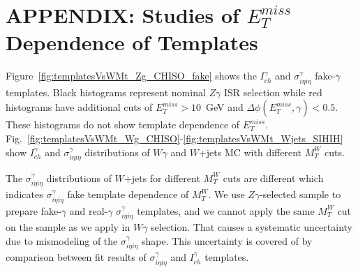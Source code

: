 \chapter{APPENDIX: Studies of $E_T^{miss}$ Dependence of Templates}
\label{sec:CompareTemplatesPlots}

Figure~\ref{fig:templatesVsWMt_Zg_CHISO_fake} shows the $I_{ch}^{\gamma}$ and $\sigma_{i\eta i\eta}^{\gamma}$ fake-$\gamma$ templates. Black histograms represent nominal $Z\gamma$ ISR selection while red histograms have additional cuts of $E_T^{miss}>10$~GeV and $\Delta \phi(E_T^{miss},\gamma)<0.5$. These histograms do not show template dependence of $E_T^{miss}$. Fig.~\ref{fig:templatesVsWMt_Wg_CHISO}-\ref{fig:templatesVsWMt_Wjets_SIHIH} show $I_{ch}^\gamma$ and $\sigma_{i \eta i \eta}^{\gamma}$ distributions of $W\gamma$ and $W$+jets MC with different $M_T^W$ cuts. 

The $\sigma_{i \eta i \eta}^\gamma$ distributions of $W$+jets for different $M_T^W$ cuts are different which indicates $\sigma_{i \eta i\eta}^\gamma$ fake template dependence of $M_T^W$. We use $Z\gamma$-selected sample to prepare fake-$\gamma$ and real-$\gamma$ $\sigma_{i \eta i \eta}^\gamma$ templates, and we cannot apply the same $M_T^W$ cut on the sample as we apply in $W\gamma$ selection. That causes a systematic uncertainty due to mismodeling of the $\sigma_{i \eta i \eta}^{\gamma}$ shape. This uncertainty is covered of by comparison between fit results of $\sigma_{i \eta i \eta}^{\gamma}$ and $I_{ch}^\gamma$ templates.

